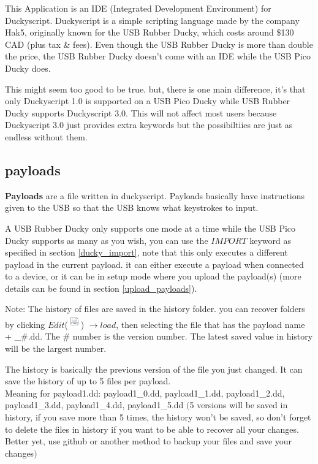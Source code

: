 \documentclass[a4paper,12pt]{article}
\begin{document}
This Application is an IDE (Integrated Development Environment) for Duckyscript. Duckyscript is a simple scripting language made by the company Hak5, originally known for the USB Rubber Ducky, which costs around \$130 CAD (plus tax \& fees).
Even though the USB Rubber Ducky is more than double the price, the USB Rubber Ducky doesn't come with an IDE while the USB Pico Ducky does.

This might seem too good to be true. but, there is one main difference,
it's that only Duckyscript 1.0 is supported on a USB Pico Ducky while USB Rubber Ducky supports Duckyscript 3.0. This will not affect most users because Duckyscript 3.0 just provides extra keywords but the possibiltiies are just as endless without them.

\subsection{payloads}

\textbf{Payloads} are a file written in duckyscript. Payloads basically have instructions given to the USB so that the USB knows what keystrokes to input.

A USB Rubber Ducky only supports one mode at a time while the USB Pico Ducky supports as many as you wish, you can use the $IMPORT$ keyword as specified in section \ref{ducky_import}, note that this only executes a different payload in the current payload. it can either execute a payload when connected to a device, or it can be in setup mode where you upload the payload(s) (more details can be found in section \ref{upload_payloads}).

Note: The history of files are saved in the history folder. you can recover folders by clicking $Edit$(\includegraphics[width=5.5mm]{pictures/black_bk/save.png}) $ \rightarrow load$, then selecting the file that has the payload name + \_\#.dd. The \# number is the version number. The latest saved value in history will be the largest number.

The history is basically the previous version of the file you just changed. It can save the history of up to 5 files per payload.
\ \\
Meaning for payload1.dd: payload1\_0.dd, payload1\_1.dd, payload1\_2.dd, payload1\_3.dd, payload1\_4.dd, payload1\_5.dd \textbf{$\textbf{(}$}5 versions will be saved in history, if you save more than 5 times, the history won't be saved, so don't forget to delete the files in history if you want to be able to recover all your changes. Better yet, use github or another method to backup your files and save your changes$\textbf{)}$
\end{document}
